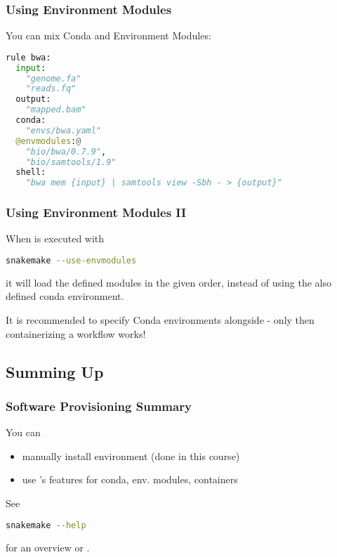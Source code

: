 \begin{frame}[fragile]
  \frametitle{Using Environment Modules}
  You can mix Conda and Environment Modules:
  \begin{lstlisting}[language=Python,style=Python]
rule bwa:
  input:
    "genome.fa"
    "reads.fq"
  output:
    "mapped.bam"
  conda:
    "envs/bwa.yaml"
  @envmodules:@
    "bio/bwa/0.7.9",
    "bio/samtools/1.9"
  shell:
    "bwa mem {input} | samtools view -Sbh - > {output}"
  \end{lstlisting}
\end{frame}

\begin{frame}[fragile]
  \frametitle{Using Environment Modules II}
  When \Snakemake{} is executed with 
  \begin{lstlisting}[language=Bash, style=Shell]
snakemake --use-envmodules
  \end{lstlisting}
  it will load the defined modules in the given order, instead of using the also defined conda environment.
  \pause
  \begin{hint}
  	It is recommended to specify Conda environments alongside - only then containerizing a workflow works!
  \end{hint}
\end{frame}

\subsection{Summing Up}

\begin{frame}[fragile]
  \frametitle{Software Provisioning Summary}
  You can
  \begin{itemize}
  	\item manually install environment (done in this course)
  	\item use \Snakemake's features for conda, env. modules, containers
  \end{itemize}
   See 
   \begin{lstlisting}[language=Bash, style=Shell]
snakemake --help
   \end{lstlisting}
   for an overview or .
\end{frame} 